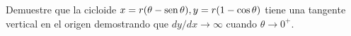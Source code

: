 \item Demuestre que la cicloide $x = r(\theta - \operatorname{sen}\theta), y = r(1 - \cos\theta)$ tiene una tangente vertical en el origen demostrando que $dy/dx \to \infty$ cuando $\theta \to 0^+$.
